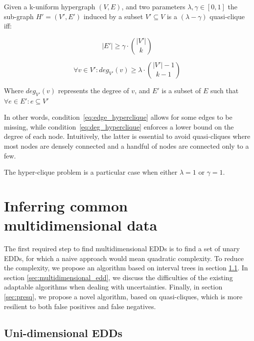 \begin{definition}
    \label{def:quasi_clique}
    Given a k-uniform hypergraph $(V,E)$, and two parameters $\lambda, \gamma \in [0,1]$
    the sub-graph $H'=(V',E')$ induced by a subset $V' \subseteq V$ is a
    $(\lambda-\gamma)$ quasi-clique iff:
    
    \begin{equation}
        |E'| \ge \gamma \cdot \binom{|V'|}{k}
        \label{eq:edge_hyperclique}
    \end{equation}
    
    \begin{equation}
        \forall v \in V': deg_{V'}(v) \ge \lambda \cdot \binom{|V'| - 1}{k - 1}
        \label{eq:deg_hyperclique}
    \end{equation}
    
    Where $deg_{V'}(v)$ represents the degree of $v$, and $E'$ is a subset of $E$ such that
    $\forall e \in E' : e \subseteq V'$
\end{definition}

In other words, condition~\ref{eq:edge_hyperclique} allows for some edges to be missing,
while condition~\ref{eq:deg_hyperclique} enforces a lower bound on the degree of each
node. Intuitively, the latter is essential to avoid quasi-cliques where most nodes
are densely connected and a handful of nodes are connected only to a few.

The hyper-clique problem is a particular case when either $\lambda = 1$ or $\gamma = 1$.



\section{Inferring common multidimensional data}
\label{sec:presq_inferring}

The first required step to find multidimensional \glspl{EDD} is to
find a set of unary \glspl{EDD}, for which a naive approach would
mean quadratic complexity. To reduce the complexity, we
propose an algorithm based on interval trees in
section \ref{sec:presq_unary}. In section
\ref{sec:multidimensional_edd}, we discuss the
difficulties of the existing adaptable algorithms
when dealing with uncertainties. Finally, in section
\ref{sec:presq}, we propose a novel algorithm, based on 
quasi-cliques, which is more resilient to both false positives
and false negatives.

\subsection{Uni-dimensional EDDs}
\label{sec:presq_unary}

